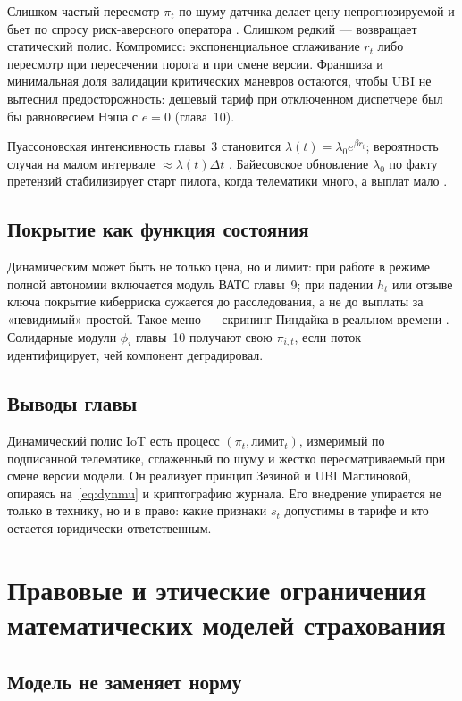 \documentclass[a4paper,14pt]{extarticle}
\begin{document}
Слишком частый пересмотр $\pi_t$ по шуму датчика делает цену непрогнозируемой и бьет по спросу риск-аверсного оператора \cite{pindyck}. Слишком редкий --- возвращает статический полис. Компромисс: экспоненциальное сглаживание $r_t$ либо пересмотр при пересечении порога и при смене версии. Франшиза и минимальная доля валидации критических маневров \cite{cbr} остаются, чтобы UBI не вытеснил предосторожность: дешевый тариф при отключенном диспетчере был бы равновесием Нэша с $e=0$ (глава~10).

Пуассоновская интенсивность главы~3 становится $\lambda(t)=\lambda_0 e^{\beta r_t}$; вероятность случая на малом интервале $\approx\lambda(t)\Delta t$ \cite{shvedov}. Байесовское обновление $\lambda_0$ по факту претензий стабилизирует старт пилота, когда телематики много, а выплат мало \cite{sabitov}.

\subsection{Покрытие как функция состояния}

Динамическим может быть не только цена, но и лимит: при работе в режиме полной автономии включается модуль ВАТС главы~9; при падении $h_t$ или отзыве ключа покрытие киберриска сужается до расследования, а не до выплаты за «невидимый» простой. Такое меню --- скрининг Пиндайка в реальном времени \cite{pindyck}. Солидарные модули $\phi_i$ главы~10 получают свою $\pi_{i,t}$, если поток идентифицирует, чей компонент деградировал.

\subsection{Выводы главы}

Динамический полис IoT есть процесс $(\pi_t,\text{лимит}_t)$, измеримый по подписанной телематике, сглаженный по шуму и жестко пересматриваемый при смене версии модели. Он реализует принцип Зезиной и UBI Маглиновой, опираясь на~\eqref{eq:dynmu} и криптографию журнала. Его внедрение упирается не только в технику, но и в право: какие признаки $s_t$ допустимы в тарифе и кто остается юридически ответственным.

\section{Правовые и этические ограничения математических моделей страхования}

\subsection{Модель не заменяет норму}
\end{document}
